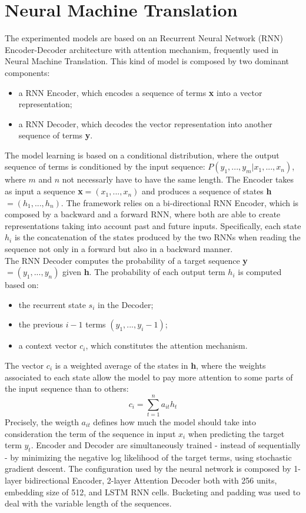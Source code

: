 
\section{Neural Machine Translation}
The experimented models are based on an Recurrent Neural Network (RNN) Encoder-Decoder
architecture with attention mechanism, frequently used in Neural Machine Translation. This kind of model is composed by two
dominant components:

\begin{itemize}
    \item a RNN Encoder, which encodes a sequence of terms \textbf{x} into a vector representation;
    \item a RNN Decoder, which decodes the vector representation into another sequence of terms \textbf{y}.
\end{itemize}
The model learning is based on a conditional distribution, where the output sequence of terms is conditioned
by the input sequence: \(P(y_1,...,y_m|x_1,...,x_n)\), where \(m\) and \(n\) not necessarly have to have the same length.
The Encoder takes as input a sequence \textbf{x}\(= (x_1,...,x_n)\) and produces
a sequence of states \textbf{h}\(= (h_1,...,h_n)\). The framework relies on a bi-directional
RNN Encoder, which is composed by a backward and a forward RNN, where both are able to create representations taking into account
past and future inputs. Specifically, each state \(h_i\) is the concatenation of the states produced by 
the two RNNs when reading the sequence not only in a forward but also in a backward manner.\\
The RNN Decoder computes the probability of a target sequence \textbf{y}\(= (y_1,...,y_n)\) given \textbf{h}. The probability
of each output term \(h_i\) is computed based on:
\begin{itemize}
    \item the recurrent state \(s_i\) in the Decoder;
    \item the previous \(i - 1\) terms \((y_1,...,y_i-1)\);
    \item a context vector \(c_i\), which constitutes the attention mechanism.
\end{itemize}
The vector \(c_i\) is a weighted average of the states in \textbf{h}, where the weights associated 
to each state allow the model to pay more attention to some parts of the input sequence than to others:
\[c_i = \sum_{t=1}^n a_{it} h_t\]
Precisely, the weigth \(a_{it}\) defines how much the model should take into consideration the term of the sequence in input \(x_i\)
when predicting the target term \(y_t\). Encoder and Decoder are simultaneously trained - instead of sequentially - by minimizing
the negative log likelihood of the target terms, using stochastic gradient descent.
The configuration used by the neural network is composed by 1-layer bidirectional Encoder, 
2-layer Attention Decoder both with 256 units, embedding size of 512, 
and LSTM RNN cells. Bucketing and padding was used to deal with the variable length of the sequences.


